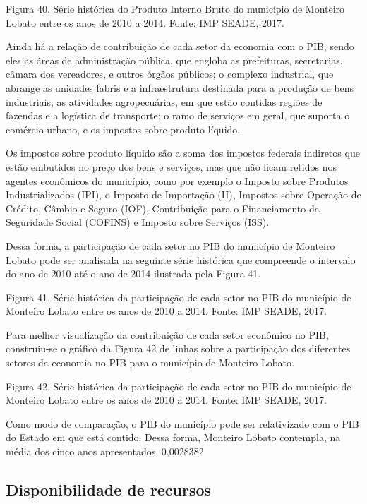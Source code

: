 Figura 40. Série histórica do Produto Interno Bruto do município de Monteiro Lobato entre os anos de 2010 a 2014.
Fonte: IMP SEADE, 2017.

Ainda há a relação de contribuição de cada setor da economia com o PIB, sendo eles as áreas de administração pública, que engloba as prefeituras, secretarias, câmara dos vereadores, e outros órgãos públicos; o complexo industrial, que abrange as unidades fabris e a infraestrutura destinada para a produção de bens industriais; as atividades agropecuárias, em que estão contidas regiões de fazendas e a logística de transporte; o ramo de serviços em geral, que suporta o comércio urbano, e os impostos sobre produto líquido.

Os impostos sobre produto líquido são a soma dos impostos federais indiretos que estão embutidos no preço dos bens e serviços, mas que não ficam retidos nos agentes econômicos do município, como por exemplo o Imposto sobre Produtos Industrializados (IPI), o Imposto de Importação (II), Impostos sobre Operação de Crédito, Câmbio e Seguro (IOF), Contribuição para o Financiamento da Seguridade Social (COFINS) e Imposto sobre Serviços (ISS).

Dessa forma, a participação de cada setor no PIB do município de Monteiro Lobato pode ser analisada na seguinte série histórica que compreende o intervalo do ano de 2010 até o ano de 2014 ilustrada pela Figura 41.
 
Figura 41. Série histórica da participação de cada setor no PIB do município de Monteiro Lobato entre os anos de 2010 a 2014.
Fonte: IMP SEADE, 2017.

Para melhor visualização da contribuição de cada setor econômico no PIB, construiu-se o gráfico da Figura 42 de linhas sobre a participação dos diferentes setores da economia no PIB para o município de Monteiro Lobato.

Figura 42. Série histórica da participação de cada setor no PIB do município de Monteiro Lobato entre os anos de 2010 a 2014.
Fonte: IMP SEADE, 2017.

Como modo de comparação, o PIB do município pode ser relativizado com o PIB do Estado em que está contido. Dessa forma, Monteiro Lobato contempla, na média dos cinco anos apresentados, 0,0028382%

\subsection{Disponibilidade de recursos}

